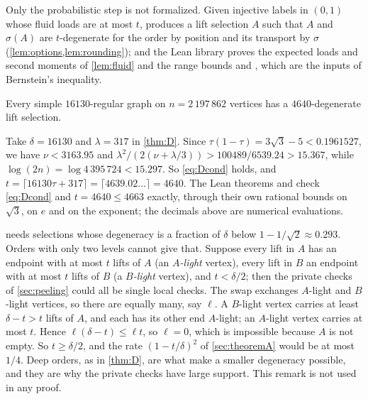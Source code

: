 Only the probabilistic step is not formalized. Given injective labels in $(0,1)$ whose fluid loads are at most $t$,
 produces a lift selection $A$ such that $A$ and $\sigma(A)$ are
$t$-degenerate for the order by position and its transport by $\sigma$ (\cref{lem:options,lem:rounding}); and the Lean
library proves the expected loads and second moments of \cref{lem:fluid} and the range bounds
 and , which are the inputs of Bernstein's
inequality.

\begin{corollary}[The base for $p=127$]\label{cor:base}
Every simple $16130$-regular graph on $n=2\,197\,862$ vertices has a $4640$-degenerate lift selection.
\end{corollary}
\begin{outline}
Take $\delta=16130$ and $\lambda=317$ in \cref{thm:D}. Since $\tau(1-\tau)=3\sqrt3-5<0.1961527$, we have $\nu<3163.95$
and $\lambda^2/(2(\nu+\lambda/3))>100489/6539.24>15.367$, while $\log(2n)=\log4\,395\,724<15.297$. So \eqref{eq:Dcond}
holds, and $t=\lceil16130\tau+317\rceil=\lceil4639.02\ldots\rceil=4640$. The Lean theorems  and  check
\eqref{eq:Dcond} and $t=4640\le4663$ exactly, through their own rational bounds on $\sqrt3$, on $e$ and on the
exponent; the decimals above are numerical evaluations.
\end{outline}

\begin{remark}\label{rem:naive}
 needs selections whose degeneracy is a fraction of $\delta$ below $1-1/\sqrt2\approx0.293$.
Orders with only two levels cannot give that. Suppose every lift in $A$ has an endpoint with at most $t$ lifts of $A$
(an \emph{$A$-light} vertex), every lift in $B$ an endpoint with at most $t$ lifts of $B$ (a \emph{$B$-light}
vertex), and $t<\delta/2$; then the private checks of \cref{sec:peeling} could all be single local checks. The swap
exchanges $A$-light and $B$-light vertices, so there are equally many, say $\ell$. A $B$-light vertex carries at least
$\delta-t>t$ lifts of $A$, and each has its other end $A$-light; an $A$-light vertex carries at most $t$. Hence
$\ell(\delta-t)\le\ell t$, so $\ell=0$, which is impossible because $A$ is not empty. So $t\ge\delta/2$, and the rate
$(1-t/\delta)^2$ of \cref{sec:theoremA} would be at most $1/4$. Deep orders, as in \cref{thm:D}, are what make a smaller
degeneracy possible, and they are why the private checks have large support. This remark is not used in any proof.
\end{remark}
